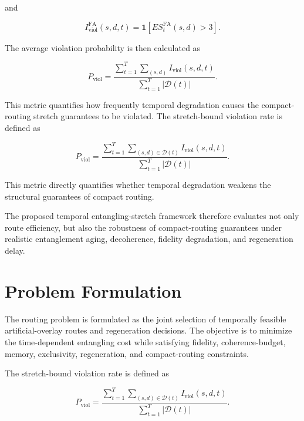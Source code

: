 and

\begin{equation}
    I_{\mathrm{viol}}^{\mathrm{FA}}(s,d,t)
    =
    \mathbf{1}
    \left[
    ES_t^{\mathrm{FA}}(s,d)
    >
    3
    \right].
\end{equation}

The average violation probability is then calculated as

\begin{equation}
    P_{\mathrm{viol}}
    =
    \frac{
    \sum_{t=1}^{T}
    \sum_{(s,d)}
    I_{\mathrm{viol}}(s,d,t)
    }
    {
    \sum_{t=1}^{T}
    |\mathcal{D}(t)|
    }.
\end{equation}

This metric quantifies how frequently temporal degradation causes the compact-routing stretch guarantees to be violated.
The stretch-bound violation rate is defined as

\begin{equation}
    P_{\mathrm{viol}}
    =
    \frac{
    \sum_{t=1}^{T}
    \sum_{(s,d)\in\mathcal{D}(t)}
    I_{\mathrm{viol}}(s,d,t)
    }
    {
    \sum_{t=1}^{T}
    |\mathcal{D}(t)|
    }.
\end{equation}

This metric directly quantifies whether temporal degradation weakens the structural guarantees of compact routing.

The proposed temporal entangling-stretch framework therefore evaluates not only route efficiency, but also the robustness of compact-routing guarantees under realistic entanglement aging, decoherence, fidelity degradation, and regeneration delay.
\section{Problem Formulation}

The routing problem is formulated as the joint selection of temporally feasible artificial-overlay routes and regeneration decisions. The objective is to minimize the time-dependent entangling cost while satisfying fidelity, coherence-budget, memory, exclusivity, regeneration, and compact-routing constraints.

The stretch-bound violation rate is defined as

\begin{equation}
    P_{\mathrm{viol}}
    =
    \frac{
    \sum_{t=1}^{T}
    \sum_{(s,d)\in\mathcal{D}(t)}
    I_{\mathrm{viol}}(s,d,t)
    }
    {
    \sum_{t=1}^{T}
    |\mathcal{D}(t)|
    }.
\end{equation}

